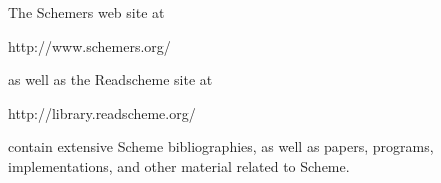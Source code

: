 
The Schemers web site at
\begin{center}
{\cf http://www.schemers.org/}
\end{center}
as well as the Readscheme site at
\begin{center}
{\cf http://library.readscheme.org/}
\end{center}
contain extensive Scheme bibliographies, as well as papers,
programs, implementations, and other material related to Scheme.

